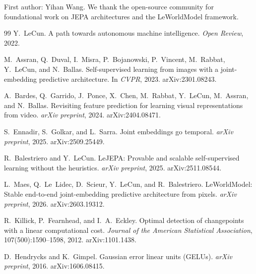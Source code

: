 \documentclass[11pt]{article}
\begin{document}
First author: Yihan Wang. We thank the open-source community for foundational work on JEPA architectures and the LeWorldModel framework.

\begin{thebibliography}{99}
Y.~LeCun.
\newblock A path towards autonomous machine intelligence.
\newblock \emph{Open Review}, 2022.

M.~Assran, Q.~Duval, I.~Misra, P.~Bojanowski, P.~Vincent, M.~Rabbat, Y.~LeCun, and N.~Ballas.
\newblock Self-supervised learning from images with a joint-embedding predictive architecture.
\newblock In \emph{CVPR}, 2023. arXiv:2301.08243.

A.~Bardes, Q.~Garrido, J.~Ponce, X.~Chen, M.~Rabbat, Y.~LeCun, M.~Assran, and N.~Ballas.
\newblock Revisiting feature prediction for learning visual representations from video.
\newblock \emph{arXiv preprint}, 2024. arXiv:2404.08471.

S.~Ennadir, S.~Golkar, and L.~Sarra.
\newblock Joint embeddings go temporal.
\newblock \emph{arXiv preprint}, 2025. arXiv:2509.25449.

R.~Balestriero and Y.~LeCun.
\newblock LeJEPA: Provable and scalable self-supervised learning without the heuristics.
\newblock \emph{arXiv preprint}, 2025. arXiv:2511.08544.

L.~Maes, Q.~Le~Lidec, D.~Scieur, Y.~LeCun, and R.~Balestriero.
\newblock LeWorldModel: Stable end-to-end joint-embedding predictive architecture from pixels.
\newblock \emph{arXiv preprint}, 2026. arXiv:2603.19312.

R.~Killick, P.~Fearnhead, and I.~A.~Eckley.
\newblock Optimal detection of changepoints with a linear computational cost.
\newblock \emph{Journal of the American Statistical Association}, 107(500):1590--1598, 2012. arXiv:1101.1438.

D.~Hendrycks and K.~Gimpel.
\newblock Gaussian error linear units (GELUs).
\newblock \emph{arXiv preprint}, 2016. arXiv:1606.08415.


\end{thebibliography}
\end{document}
